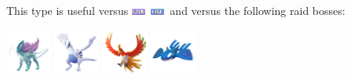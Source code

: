 \documentclass[12pt]{beamer}
\newcommand{\flyingfull}{\includegraphics[height=0.2cm]{../../images/type/full/Flying.png}}
\newcommand{\waterfull}{\includegraphics[height=0.2cm]{../../images/type/full/Water.png}}
\begin{document}
\begin{frame}[label=Electric]
\begin{footnotesize}
\begin{block}{}\begin{center}
This type is useful versus \flyingfull~\waterfull~and versus the following raid bosses:

    \includegraphics[width=1.5cm]{../../images/pokemon/suicune}
    \includegraphics[width=1.5cm]{../../images/pokemon/lugia.png}
    \includegraphics[width=1.5cm]{../../images/pokemon/ho-oh}
    \includegraphics[width=1.5cm]{../../images/pokemon/kyogre}
\end{center}
\end{block}

\end{footnotesize}
\end{frame}



\end{document}

